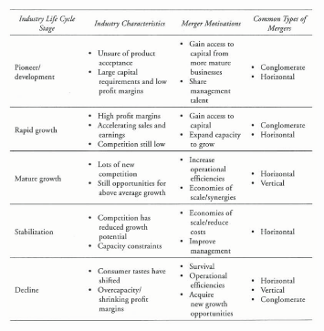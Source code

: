 \documentclass{article}
\begin{document}
\begin{figure}[ht]
    \center
    \includegraphics[width=0.8\textwidth]{figs/merger}
\end{figure}
\end{document}

